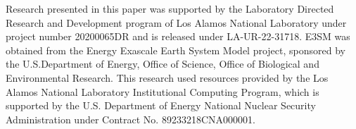\documentclass{juliacon}
\begin{document}
Research presented in this paper was supported by the Laboratory
Directed Research and Development program of Los Alamos National
Laboratory under project number 20200065DR and is released
under LA-UR-22-31718. E3SM was obtained from the Energy Exascale
Earth System Model project, sponsored by the U.S.Department
of Energy, Office of Science, Office of Biological and Environmental
Research. This research used resources provided by the Los Alamos
National Laboratory Institutional Computing Program, which is
supported by the U.S. Department of Energy National Nuclear Security
Administration under Contract No. 89233218CNA000001.



\end{document}
